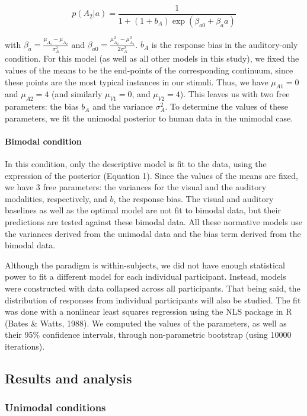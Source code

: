 \documentclass[english,floatsintext,man]{apa6}
\theoremstyle{definition}
\theoremstyle{definition}
\theoremstyle{definition}
\theoremstyle{remark}
\begin{document}
\[p(A_2 | a)=\frac{1}{1+(1+b_A)\exp(\beta_{a0}+\beta_aa)}\]

with \(\beta_a=\frac{\mu_{A_1}-\mu_{A_2}}{\sigma^2_{A}}\) and
\(\beta_{a0}=\frac{\mu^2_{A_2}-\mu^2_{A_1}}{2\sigma^2_{A}}\). \(b_A\) is
the response bias in the auditory-only condition. For this model (as
well as all other models in this study), we fixed the values of the
means to be the end-points of the corresponding continuum, since these
points are the most typical instances in our stimuli. Thus, we have
\(\mu_{A1}=0\) and \(\mu_{A2}=4\) (and similarly \(\mu_{V1}=0\), and
\(\mu_{V2}=4\)). This leaves us with two free parameters: the bias
\(b_A\) and the variance \(\sigma^2_{A}\). To determine the values of
these parameters, we fit the unimodal posterior to human data in the
unimodal case.

\paragraph{Bimodal condition}\label{bimodal-condition}

In this condition, only the descriptive model is fit to the data, using
the expression of the posterior (Equation 1). Since the values of the
means are fixed, we have 3 free parameters: the variances for the visual
and the auditory modalities, respectively, and \(b\), the response bias.
The visual and auditory baselines as well as the optimal model are not
fit to bimodal data, but their predictions are tested against these
bimodal data. All these normative models use the variances derived from
the unimodal data and the bias term derived from the bimodal data.

Although the paradigm is within-subjects, we did not have enough
statistical power to fit a different model for each individual
participant. Instead, models were constructed with data collapsed across
all participants. That being said, the distribution of responses from
individual participants will also be studied. The fit was done with a
nonlinear least squares regression using the NLS package in R (Bates \&
Watts, 1988). We computed the values of the parameters, as well as their
95\% confidence intervals, through non-parametric bootstrap (using 10000
iterations).

\subsection{Results and analysis}\label{results-and-analysis}

\subsubsection{Unimodal conditions}\label{unimodal-conditions}
\end{document}
